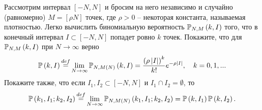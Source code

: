 \begin{problem}
Рассмотрим интервал 
$\left[ {-N,N} \right]$ и бросим на него независимо и случайно (равномерно) \mbox{$M=\left[ {\rho N} \right]$} точек, где $\rho >0$ -- некоторая 
константа, называемая плотностью. Легко вычислить биномиальную вероятность 
$\mathrm{{\mathbb P}}_{N,M} \left( {k,I} \right)$ того, что в конечный интервал $I\subset 
\left[ {-N,N} \right]$ попадет ровно $k$ точек. Покажите, что для $\mathrm{{\mathbb P}}_{N,M} 
\left( {k,I} \right)$  при $N\to \infty $ верно 
\[
\mathrm{{\mathbb P}}\left( {k,I} \right)\mathop =\limits^{def} \mathop {\lim }\limits_{N\to 
\infty } \mathrm{{\mathbb P}}_{N,M\left( N \right)} \left( {k,I} \right)=\frac{\left( {\rho 
\left| I \right|} \right)^k}{k!}e^{-\rho \left| I \right|},
\quad
k=0,1,...
\]
Покажите также, что если $I_1 ,I_2 \subset \left[ {-N,N} \right]$ и $I_1 
\cap I_2 =\emptyset $, то
\[
\mathrm{{\mathbb P}} \left( {k_1 ,I_1 ;k_2 ,I_2 } \right)\mathop =\limits^{def} \mathop {\lim 
}\limits_{N\to \infty } \mathrm{{\mathbb P}}_{N,M\left( N \right)} \left( {k_1 ,I_1 ;k_2 ,I_2 } 
\right)=\mathrm{{\mathbb P}}\left( {k,I_1 } \right)\mathrm{{\mathbb P}}\left( {k,I_2 } \right).
\]
\end{problem}




